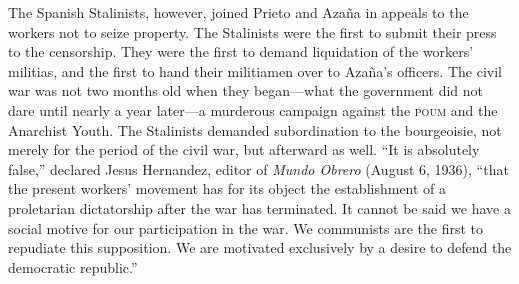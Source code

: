 The Spanish Stalinists, however, joined Prieto and Azaña in appeals to the workers not to seize property. The Stalinists were the first to submit their press to the censorship. They were the first to demand liquidation of the workers’ militias, and the first to hand their militiamen over to Azaña’s officers. The civil war was not two months old when they began---what the government did not dare until nearly a year later---a murderous campaign against the \textsc{poum} and the Anarchist Youth. The Stalinists demanded subordination to the bourgeoisie, not merely for the period of the civil war, but afterward as well. ``It is absolutely false,'' declared Jesus Hernandez, editor of \emph{Mundo Obrero} (August 6, 1936), ``that the present workers’ movement has for its object the establishment of a proletarian dictatorship after the war has terminated. It cannot be said we have a social motive for our participation in the war. We communists are the first to repudiate this supposition. We are motivated exclusively by a desire to defend the democratic republic.''

